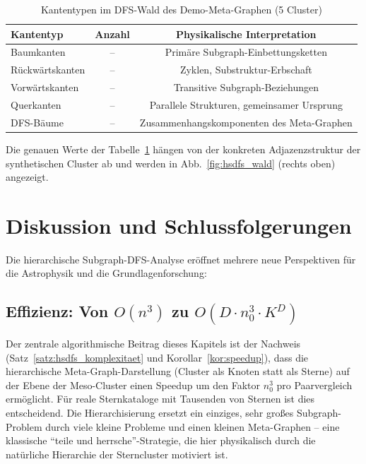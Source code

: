 ﻿\documentclass[a4paper,12pt]{report}
\theoremstyle{definition}
\begin{document}
\begin{table}[H]
\centering
\caption{Kantentypen im DFS-Wald des Demo-Meta-Graphen (5 Cluster)}
\begin{tabular}{lcc}
\toprule
Kantentyp & Anzahl & Physikalische Interpretation \\
\midrule
Baumkanten & -- & Primäre Subgraph-Einbettungsketten \\
Rückwärtskanten & -- & Zyklen, Substruktur-Erbschaft \\
Vorwärtskanten & -- & Transitive Subgraph-Beziehungen \\
Querkanten & -- & Parallele Strukturen, gemeinsamer Ursprung \\
DFS-Bäume & -- & Zusammenhangskomponenten des Meta-Graphen \\
\bottomrule
\end{tabular}
\label{tab:dfs_kanten}
\end{table}

Die genauen Werte der Tabelle~\ref{tab:dfs_kanten} hängen von der konkreten Adjazenzstruktur der synthetischen Cluster ab und werden in Abb.~\ref{fig:hsdfs_wald} (rechts oben) angezeigt.

\section{Diskussion und Schlussfolgerungen}
\label{ssec:hsdfs_diskussion}

Die hierarchische Subgraph-DFS-Analyse eröffnet mehrere neue Perspektiven für die Astrophysik und die Grundlagenforschung:

\subsection{Effizienz: Von $O(n^3)$ zu $O(D \cdot n_0^3 \cdot K^D)$}

Der zentrale algorithmische Beitrag dieses Kapitels ist der Nachweis (Satz~\ref{satz:hsdfs_komplexitaet} und Korollar~\ref{kor:speedup}), dass die hierarchische Meta-Graph-Darstellung (Cluster als Knoten statt als Sterne) auf der Ebene der Meso-Cluster einen Speedup um den Faktor $n_0^3$ pro Paarvergleich ermöglicht. Für reale Sternkataloge mit Tausenden von Sternen ist dies entscheidend. Die Hierarchisierung ersetzt ein einziges, sehr großes Subgraph-Problem durch viele kleine Probleme und einen kleinen Meta-Graphen -- eine klassische ``teile und herrsche''-Strategie, die hier physikalisch durch die natürliche Hierarchie der Sterncluster motiviert ist.
\end{document}
